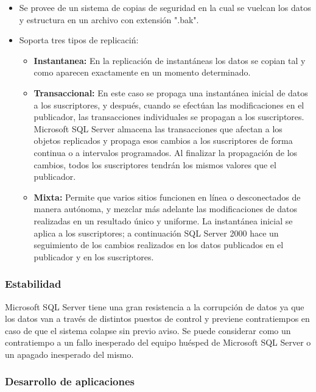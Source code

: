 			\begin{itemize}
				\item Se provee de un sistema de copias de seguridad en la cual se vuelcan los datos y estructura en un archivo con extensi\'on ".bak".

				\item Soporta tres tipos de replicaci\'n:
					\begin{itemize}
						\item \textbf{Instantanea:} En la replicaci\'on de instant\'aneas los datos se copian tal y como aparecen exactamente en un momento determinado.

						\item \textbf{Transaccional:} En este caso se propaga una instant\'anea inicial de datos a los suscriptores, y despu\'es, cuando se efect\'uan las modificaciones en el publicador, las transacciones individuales se propagan a los suscriptores. Microsoft SQL Server almacena las transacciones que afectan a los objetos replicados y propaga esos cambios a los suscriptores de forma continua o a intervalos programados. Al finalizar la propagaci\'on de los cambios, todos los suscriptores tendr\'an los mismos valores que el publicador.

						\item \textbf{Mixta:} Permite que varios sitios funcionen en l\'inea o desconectados de manera aut\'onoma, y mezclar m\'as adelante las modificaciones de datos realizadas en un resultado \'unico y uniforme. La instant\'anea inicial se aplica a los suscriptores; a continuaci\'on SQL Server 2000 hace un seguimiento de los cambios realizados en los datos publicados en el publicador y en los suscriptores.
					\end{itemize}
			\end{itemize}

		\subsubsection{Estabilidad}

			Microsoft SQL Server tiene una gran resistencia a la corrupci\'on de datos  ya que los datos van a trav\'es de distintos puestos de control y previene contratiempos en caso de que el sistema colapse sin previo aviso. Se puede considerar como un contratiempo a un fallo inesperado del equipo hu\'esped de Microsoft SQL Server o un apagado inesperado del mismo.

		\subsubsection{Desarrollo de aplicaciones}

